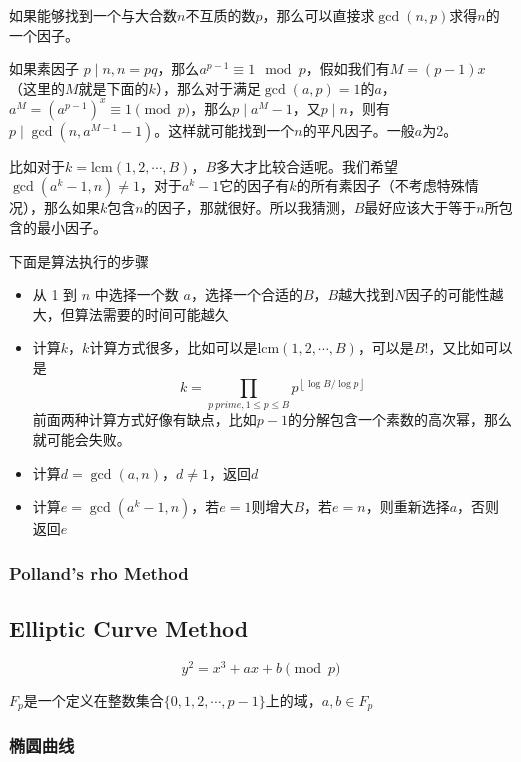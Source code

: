 \documentclass{article}
\begin{document}
如果能够找到一个与大合数$n$不互质的数$p$，那么可以直接求$\gcd(n,p)$求得$n$的一个因子。 


如果素因子 $p\mid n, n=pq$，那么$a^{p-1}\equiv 1 \mod{p}$，假如我们有$M=(p-1)x$（这里的$M$就是下面的$k$），那么对于满足$\gcd(a,p)=1$的$a$，$a^M=(a^{p-1})^x\equiv 1\pmod{p}$，那么$p\mid a^M-1$，又$p\mid n$，则有$p\mid\gcd(n,a^{M-1}-1)$。这样就可能找到一个$n$的平凡因子。一般$a$为2。

比如对于$k=\mathrm{lcm}(1,2,\cdots,B)$，$B$多大才比较合适呢。我们希望$\gcd(a^k-1,n)\neq 1$，对于$a^k-1$它的因子有$k$的所有素因子（不考虑特殊情况），那么如果$k$包含$n$的因子，那就很好。所以我猜测，$B$最好应该大于等于$n$所包含的最小因子。

下面是算法执行的步骤

\begin{itemize}
    \item 从 1 到 $n$ 中选择一个数 $a$，选择一个合适的$B$，$B$越大找到$N$因子的可能性越大，但算法需要的时间可能越久
    \item 计算$k$，$k$计算方式很多，比如可以是$\mathrm{lcm}(1,2,\cdots,B)$，可以是$B!$，又比如可以是
    \begin{equation}
            k=\prod_{p~prime, 1\le p \le B}p^{\left\lfloor\log B/\log p\right\rfloor}
    \end{equation}
    前面两种计算方式好像有缺点，比如$p-1$的分解包含一个素数的高次幂，那么就可能会失败。
    \item 计算$d=\gcd(a,n)$，$d\neq 1$，返回$d$
    \item 计算$e=\gcd(a^k-1,n)$，若$e=1$则增大$B$，若$e=n$，则重新选择$a$，否则返回$e$
\end{itemize}

\subsubsection{Polland's rho Method}

\subsection{Elliptic Curve Method}

\begin{equation}
    y^2=x^3+ax+b\pmod{p}
\end{equation}

$F_p$是一个定义在整数集合$\{0,1,2,\cdots,p-1\}$上的域，$a,b\in F_p$

\subsubsection{椭圆曲线}
\end{document}
